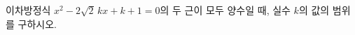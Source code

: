 \hspace*{2mm}\begin{minipage}[t]{\dimexpr\linewidth-2mm\relax}\vspace{0pt}
이차방정식 $x^2-2\sqrt{2}\,kx+k+1=0$의 두 근이 모두 양수일 때, 실수 $k$의 값의 범위를 구하시오.\end{minipage}
